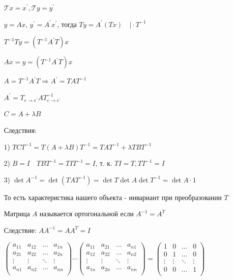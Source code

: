 \documentclass[12pt]{article}
\begin{document}
    $\mathcal{T}x = x^\prime, \mathcal{T}y = y^\prime$

    $y = Ax$, $y^\prime = A^\prime x^\prime$, тогда $Ty = A^\prime (Tx) \quad \Big| \cdot T^{-1}$

    $T^{-1}Ty = (T^{-1}A^\prime T)x$
    
    $Ax = y = (T^{-1}A^\prime T)x$

    $A = T^{-1}A^\prime T \Longrightarrow A^\prime = TA T^{-1}$



    \Th $A^\prime = T_{e\to e^\prime} A T^{-1}_{e\to e^\prime}$

    \Nota $C = A + \lambda B$

    Следствия:

    1) $TCT^{-1} = T (A + \lambda B) T^{-1} = T A T^{-1} + \lambda T B T^{-1}$

    2) $B = I \quad T B T^{-1} = T I T^{-1} = I$, т. к. $TI = T, T T^{-1} = I$

    3) $\det A^{-1} = \det (T A T^{-1}) = \det T \det A \det T^{-1} = \det A \cdot 1$

    \Nota То есть характеристика нашего объекта - инвариант при преобразовании $T$

    \Def Матрица $A$ называется ортогональной если $A^{-1} = A^T$

    Следствие: $AA^{-1} = AA^T = I$

    $\begin{pmatrix}
         a_{11} & a_{12} & \dots & a_{1n} \\
         a_{21} & a_{22} & \dots & a_{2n} \\
         \vdots & \vdots & \ddots & \vdots \\
         a_{n1} & a_{n2} & \dots & a_{nn} \\
    \end{pmatrix} \cdots \begin{pmatrix}
         a_{11} & a_{21} & \dots & a_{n1} \\
         a_{12} & a_{22} & \dots & a_{n2} \\
         \vdots & \vdots & \ddots & \vdots \\
         a_{1n} & a_{2n} & \dots & a_{nn} \\
    \end{pmatrix} = \begin{pmatrix}
         1 & 0 & \dots & 0 \\
         0 & 1 & \dots & 0 \\
         \vdots & \vdots & \ddots & \vdots \\
         0 & 0 & \dots & 1 \\
    \end{pmatrix}$
\end{document}
